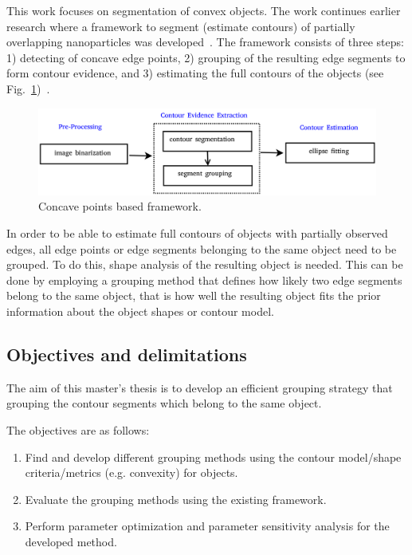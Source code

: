 \documentclass{lutmscthesis}[2010/09/22]
\begin{document}
This work focuses on segmentation of convex objects. The work continues earlier research where a framework to segment (estimate contours) of partially overlapping nanoparticles was developed~\cite{zafari2017comparison}. The framework consists of three steps: 
1) detecting of concave edge points, 
2) grouping of the resulting edge segments to form contour evidence, and 3) estimating the full contours of the objects (see Fig.~\ref{fig:concave_framework})~\cite{Zafari15,zafari-bb}.

\begin{figure}[ht]
  \includegraphics[width=\linewidth]{concave-framework.png}
  \caption{Concave points based framework.~\cite{zafari-bb}}
  \label{fig:concave_framework}
\end{figure}

In order to be able to estimate full contours of objects with partially observed edges, all edge points or edge segments belonging to the same object need to be grouped. To do this, shape analysis of the resulting object is needed. This can be done by employing a grouping method that defines how likely two edge segments belong to the same object, that is how well the resulting object fits the prior information about the object shapes or contour model. 


\subsection{Objectives and delimitations}
\label{sec:objectives}

The aim of this master’s thesis is to develop an efficient grouping strategy that grouping the contour segments which belong to the same object.

The objectives are as follows:
\begin{enumerate}
\item Find and develop different grouping methods using the contour model/shape criteria/metrics (e.g. convexity) for objects.
\item Evaluate the grouping methods using the existing framework.
\item Perform parameter optimization and parameter sensitivity analysis for the developed method.
\end{enumerate}
\end{document}
